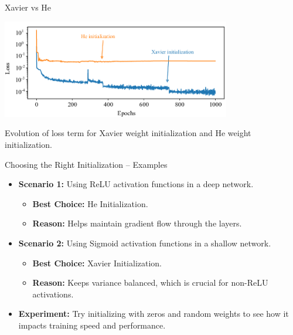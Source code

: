 \documentclass[serif, aspectratio=169]{beamer}
\begin{document}
\begin{frame}{Xavier vs He}
    \begin{center}
        \includegraphics[width=10cm]{pic/Evolution-of-loss-term-for-Xavier-weight-initialization-and-He-weight-initialization.png}  
    \end{center}
Evolution of loss term for Xavier weight initialization and He weight initialization.
\end{frame}
\begin{frame}{Choosing the Right Initialization – Examples}

    \begin{itemize}
        \item \textbf{Scenario 1:} Using ReLU activation functions in a deep network.
        \begin{itemize}
            \item \textbf{Best Choice:} He Initialization.
            \item \textbf{Reason:} Helps maintain gradient flow through the layers.
        \end{itemize}
        
        \item \textbf{Scenario 2:} Using Sigmoid activation functions in a shallow network.
        \begin{itemize}
            \item \textbf{Best Choice:} Xavier Initialization.
            \item \textbf{Reason:} Keeps variance balanced, which is crucial for non-ReLU activations.
        \end{itemize}
        
        \item \textbf{Experiment:} Try initializing with zeros and random weights to see how it impacts training speed and performance.
    \end{itemize}
    
\end{frame}
\end{document}
